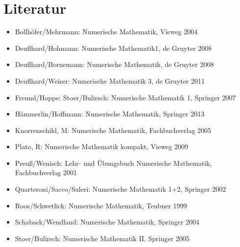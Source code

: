 \newpage
\section*{Literatur}
\begin{itemize}
	\item Bollhöfer/Mehrmann: Numerische Mathematik, Vieweg 2004
	\item Deuflhard/Hohmann: Numerische Mathematik1, de Gruyter 2008
	\item Deuflhard/Bornemann: Numerische Mathematik, de Gruyter 2008
	\item Deuflhard/Weiser: Numerische Mathematik 3, de Gruyter 2011
	\item Freund/Hoppe: Stoer/Bulirsch: Numerische Mathematik 1, Springer 2007
	\item Hämmerlin/Hoffmann: Numerische Mathematik, Springer 2013
	\item Knorrenschild, M: Numerische Mathematik, Fachbuchverlag 2005
	\item Plato, R: Numerische Mathematik kompakt, Vieweg 2009
	\item Preuß/Wenisch: Lehr- und Übungsbuch Numerische Mathematik, Fachbuchverlag 2001
	\item Quarteroni/Sacco/Saleri: Numerische Mathematik 1+2, Springer 2002
	\item Roos/Schwetlick: Numerische Mathematik, Teubner 1999
	\item Schaback/Wendland: Numerische Mathematik, Springer 2004
	\item Stoer/Bulirsch: Numerische Mathematik II, Springer 2005
\end{itemize}
